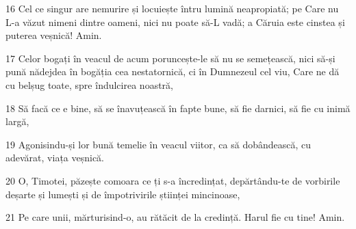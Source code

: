 \par 16 Cel ce singur are nemurire și locuiește întru lumină neapropiată; pe Care nu L-a văzut nimeni dintre oameni, nici nu poate să-L vadă; a Căruia este cinstea și puterea veșnică! Amin.
\par 17 Celor bogați în veacul de acum poruncește-le să nu se semețească, nici să-și pună nădejdea în bogăția cea nestatornică, ci în Dumnezeul cel viu, Care ne dă cu belșug toate, spre îndulcirea noastră,
\par 18 Să facă ce e bine, să se înavuțească în fapte bune, să fie darnici, să fie cu inimă largă,
\par 19 Agonisindu-și lor bună temelie în veacul viitor, ca să dobândească, cu adevărat, viața veșnică.
\par 20 O, Timotei, păzește comoara ce ți s-a încredințat, depărtându-te de vorbirile deșarte și lumești și de împotrivirile științei mincinoase,
\par 21 Pe care unii, mărturisind-o, au rătăcit de la credință. Harul fie cu tine! Amin.


